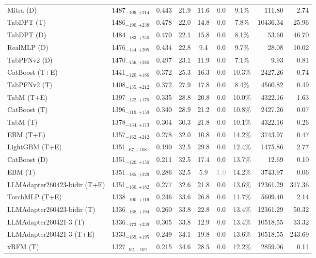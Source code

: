 \begin{tabular}{llcccccrr}
Mitra (D) & 1487${}_{-109,+214}$ & 0.443 & 21.9 & 11.6 & 0.0 & 9.1\% & 111.80 & 2.74 \\
TabDPT (T) & 1486${}_{-190,+238}$ & 0.478 & 22.0 & 14.8 & 0.0 & 7.8\% & 10436.34 & 25.96 \\
TabDPT (D) & 1484${}_{-183,+250}$ & 0.470 & 22.1 & 15.8 & 0.0 & 8.1\% & 53.60 & 46.70 \\
RealMLP (D) & 1476${}_{-144,+205}$ & 0.434 & 22.8 & 9.4 & 0.0 & 9.7\% & 28.08 & 10.02 \\
TabPFNv2 (D) & 1470${}_{-156,+280}$ & 0.497 & 23.1 & 11.9 & 0.0 & 7.1\% & 9.93 & 0.81 \\
CatBoost (T+E) & 1441${}_{-120,+186}$ & 0.372 & 25.3 & 16.3 & 0.0 & 10.3\% & 2427.26 & 0.74 \\
TabPFNv2 (T) & 1408${}_{-135,+212}$ & 0.372 & 27.9 & 17.8 & 0.0 & 8.4\% & 4560.82 & 0.49 \\
TabM (T+E) & 1397${}_{-122,+175}$ & 0.335 & 28.8 & 20.8 & 0.0 & 10.0\% & 4322.16 & 1.63 \\
CatBoost (T) & 1396${}_{-119,+159}$ & 0.340 & 28.9 & 21.2 & 0.0 & 10.8\% & 2427.26 & 0.07 \\
TabM (T) & 1378${}_{-134,+173}$ & 0.304 & 30.3 & 21.8 & 0.0 & 10.1\% & 4322.16 & 0.26 \\
EBM (T+E) & 1357${}_{-162,+212}$ & 0.278 & 32.0 & 10.8 & 0.0 & 14.2\% & 3743.97 & 0.47 \\
LightGBM (T+E) & 1351${}_{-67,+108}$ & 0.190 & 32.5 & 29.8 & 0.0 & 12.4\% & 1475.86 & 2.77 \\
CatBoost (D) & 1351${}_{-120,+150}$ & 0.211 & 32.5 & 17.4 & 0.0 & 13.7\% & 12.69 & 0.10 \\
EBM (T) & 1351${}_{-185,+229}$ & 0.286 & 32.5 & 5.9 & \textcolor{silver}{\textbf{1.0}} & 14.2\% & 3743.97 & 0.06 \\
LLMAdapter260423-bidir (T+E) & 1351${}_{-160,+182}$ & 0.277 & 32.6 & 21.8 & 0.0 & 13.6\% & 12361.29 & 317.36 \\
TorchMLP (T+E) & 1338${}_{-100,+119}$ & 0.246 & 33.6 & 26.8 & 0.0 & 11.7\% & 5609.40 & 2.14 \\
LLMAdapter260423-bidir (T) & 1336${}_{-168,+194}$ & 0.260 & 33.8 & 22.8 & 0.0 & 13.4\% & 12361.29 & 50.32 \\
LLMAdapter260421-3 (T) & 1336${}_{-173,+239}$ & 0.305 & 33.8 & 12.9 & 0.0 & 13.4\% & 10518.55 & 33.32 \\
LLMAdapter260421-3 (T+E) & 1333${}_{-169,+195}$ & 0.249 & 34.1 & 19.8 & 0.0 & 13.6\% & 10518.55 & 243.69 \\
xRFM (T) & 1327${}_{-92,+102}$ & 0.215 & 34.6 & 28.5 & 0.0 & 12.2\% & 2859.06 & 0.11 \\

\end{tabular}
